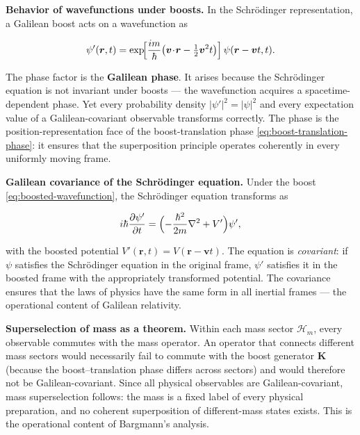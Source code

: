 \medskip\noindent\textbf{Behavior of wavefunctions under boosts.} In the Schr\"odinger representation, a Galilean boost acts on a wavefunction as
\begin{linenomath}
\begin{equation}
\psi'(\bm r, t) = \exp\!\Bigl[\frac{i m}{\hbar}\bigl(\bm v\!\cdot\!\bm r - \tfrac{1}{2}\bm v^{2}t\bigr)\Bigr]\,
\psi(\bm r - \bm v t, t).
\label{eq:boosted-wavefunction}
\end{equation}
\end{linenomath}
The phase factor is the \textbf{Galilean phase}. It arises because the Schr\"odinger equation is not invariant under boosts --- the wavefunction acquires a spacetime-dependent phase. Yet every probability density $|\psi'|^{2} = |\psi|^{2}$ and every expectation value of a Galilean-covariant observable transforms correctly. The phase is the position-representation face of the boost-translation phase \eqref{eq:boost-translation-phase}: it ensures that the superposition principle operates coherently in every uniformly moving frame.

\medskip\noindent\textbf{Galilean covariance of the Schr\"odinger equation.} Under the boost \eqref{eq:boosted-wavefunction}, the Schr\"odinger equation transforms as
\begin{linenomath}
\begin{equation}
i\hbar\frac{\partial\psi'}{\partial t} = \Bigl(-\frac{\hbar^{2}}{2m}\nabla^{2} + V'\Bigr)\psi',
\end{equation}
\end{linenomath}
with the boosted potential $V'(\bm r,t) = V(\bm r - \bm v t)$. The equation is \emph{covariant}: if $\psi$ satisfies the Schr\"odinger equation in the original frame, $\psi'$ satisfies it in the boosted frame with the appropriately transformed potential. The covariance ensures that the laws of physics have the same form in all inertial frames --- the operational content of Galilean relativity.

\medskip\noindent\textbf{Superselection of mass as a theorem.} Within each mass sector $\mathcal{H}_{m}$, every observable commutes with the mass operator. An operator that connects different mass sectors would necessarily fail to commute with the boost generator $\bm K$ (because the boost--translation phase differs across sectors) and would therefore not be Galilean-covariant. Since all physical observables are Galilean-covariant, mass superselection follows: the mass is a fixed label of every physical preparation, and no coherent superposition of different-mass states exists. This is the operational content of Bargmann's analysis.

